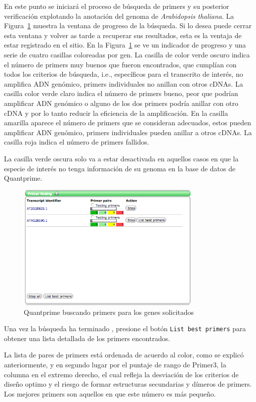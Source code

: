 \documentclass[letter,11pt]{book}
\begin{document}
En este punto se iniciará el proceso de búsqueda de primers y su posterior verificación explotando la anotación del genoma de \textit{Arabidopsis thaliana}. La Figura~\ref{fig:QP_progress} muestra la ventana de progreso de la búsqueda. Si lo desea puede cerrar esta ventana y volver as tarde a recuperar sus resultados, esta es la ventaja de estar registrado en el sitio. En la Figura~\ref{fig:QP_progress} se ve un indicador de progreso y una serie de cuatro casillas coloreadas por gen. La casilla de color verde oscuro indica el número de primers muy buenos que fueron encontrados, que cumplían con todos los criterios de búsqueda, i.e., específicos para el transcrito de interés, no amplifica ADN genómico, primers individuales no anillan con otros cDNAs. La casilla color verde claro indica el número de primers bueno, peor que podrían amplificar ADN genómico o alguno de los dos primers podría anillar con otro cDNA y por lo tanto reducir la eficiencia de la amplificación. En la casilla amarilla aparece el número de primers que se consideran adecuados, estos pueden amplificar ADN genómico, primers individuales pueden anillar a otros cDNAs. La casilla roja indica el número de primers fallidos.

La casilla verde oscura solo va a estar desactivada en aquellos casos en que la especie de interés no tenga información de su genoma en la base de datos de {\sc Quantprime}.

\begin{figure}[h!]
\centering
 \includegraphics[width=9cm]{Figs/QP_progress.png}
 \caption{\label{fig:QP_progress}{\sc Quantprime} buscando primers para los genes solicitados}
\end{figure}

Una vez la búsqueda ha terminado , presione el botón \Verb+List best primers+ para obtener una lista detallada de los primers encontrados.

La lista de pares de primers está ordenada de acuerdo al color, como se explicó anteriormente, y en segundo lugar por el puntaje de rango de Primer3, la columna en el extremo derecho, el cual refleja la desviación de los criterios de diseño optimo y el riesgo de formar estructuras secundarias y dímeros de primers. Los mejores primers son aquellos en que este número es más pequeño.
\end{document}
